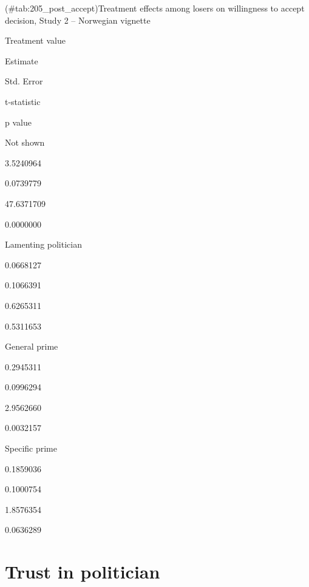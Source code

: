 \documentclass[]{book}
\begin{document}
(\#tab:205\_post\_accept)Treatment effects among losers on willingness
to accept decision, Study 2 -- Norwegian vignette

Treatment value

Estimate

Std. Error

t-statistic

p value

Not shown

3.5240964

0.0739779

47.6371709

0.0000000

Lamenting politician

0.0668127

0.1066391

0.6265311

0.5311653

General prime

0.2945311

0.0996294

2.9562660

0.0032157

Specific prime

0.1859036

0.1000754

1.8576354

0.0636289

\section{Trust in politician}\label{trust-in-politician-1}
\end{document}
